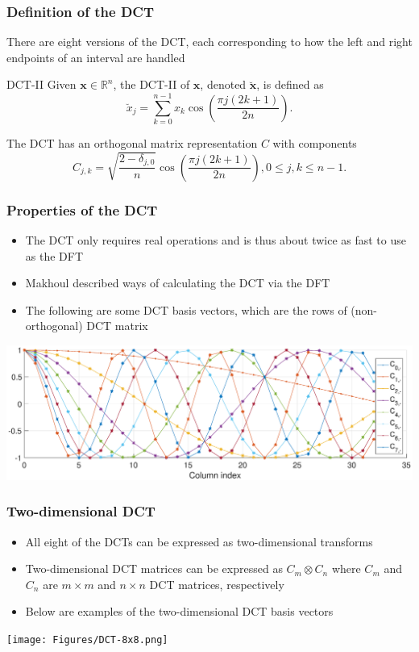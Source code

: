 \documentclass[t]{beamer}
\newcommand{\dct}[1]{\breve{#1}}	%
\begin{document}
\begin{frame}
\frametitle{Definition of the DCT}
There are eight versions of the DCT, each corresponding to how the left and right endpoints of an interval are handled \cite[p.~36-39]{GolubVanLoan2013}
\begin{block}{DCT-II}
Given $\mathbf{x} \in \mathbb{R}^n$, the DCT-II of $\mathbf{x}$, denoted $\dct{\mathbf{x}}$, is defined as
\[\dct{x}_j = \sum_{k=0}^{n-1} x_k\cos\left(\frac{\pi{j}(2k + 1)}{2n}\right).\]
\end{block}
The DCT has an orthogonal matrix representation $C$ with components
\[C_{j,k} = \sqrt{\frac{2 - \delta_{j,0}}{n}} \cos\left(\frac{\pi{j}(2k + 1)}{2n}\right), 0 \leq j,k \leq n-1.\]
\end{frame}

\begin{frame}
\frametitle{Properties of the DCT}
\begin{itemize}[nosep]
\item The DCT only requires real operations and is thus about twice as fast to use as the DFT \cite{RaoYip2014} 
\item Makhoul \cite{Makhoul1980} described ways of calculating the DCT via the DFT
\item The following are some DCT basis vectors, which are the rows of (non-orthogonal) DCT matrix
\end{itemize}
\begin{center}
\includegraphics[scale=0.27]{Figures/DCT_Vectors.eps}
\end{center}
\end{frame}

\begin{frame}
\frametitle{Two-dimensional DCT}
  \begin{itemize}
   \item All eight of the DCTs can be expressed as two-dimensional transforms
   \item Two-dimensional DCT matrices can be expressed as $C_m \otimes C_n$ where $C_m$ and $C_n$ are $m \times m$ and $n \times n$ DCT matrices, respectively
   \item Below are examples of the two-dimensional DCT basis vectors
  \end{itemize}
 \begin{center}
  \texttt{[image: Figures/DCT-8x8.png]}
 \end{center}
\end{frame}
\end{document}
